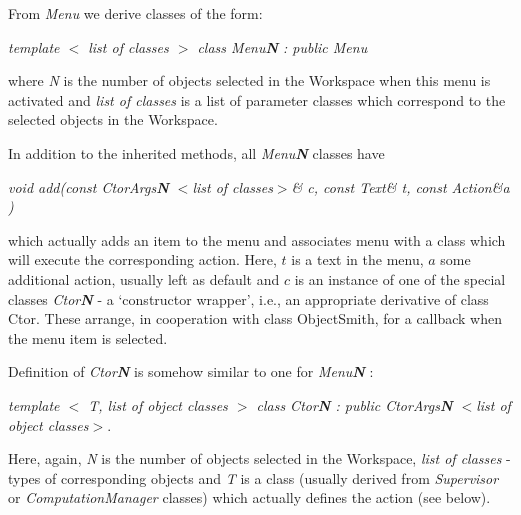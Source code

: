 \documentclass[12pt]{article}
\begin{document}
  From  \emph{Menu} we derive classes of the form:
  \begin{center}
  \emph{template $<$ list of classes $>$ class Menu\textbf{N} : public Menu}
  \end{center}
  where \emph{N} is the number of objects selected in the Workspace when this
  menu is activated and  \emph{list of classes} is a list of parameter classes 
  which correspond to the selected objects in the Workspace. 

  In addition to the inherited methods, all \emph{Menu\textbf{N}} classes
  have  
  \begin{center}
  \emph{void add(const CtorArgs\textbf{N} $<$list of classes$>$\& c, const Text\& 
  t, const Action\&a ) }
  \end{center}
  which actually adds an item to the menu and associates menu with a class
  which will execute the corresponding action. Here, $t$ is a text in the menu,
  $a$ some additional action, usually left as default and $c$ is an instance of
  one of the  special classes \emph{Ctor\textbf{N}} - a
   `constructor wrapper', i.e., an appropriate derivative of class Ctor.
   These arrange, in cooperation with class ObjectSmith, for a callback
   when the menu item is selected. 

  Definition of \emph{Ctor\textbf{N} } is somehow similar to one for 
  \emph{Menu\textbf{N} }:
  \begin{center}
  \emph{template $<$ T, list of object classes $>$ class Ctor\textbf{N} : public 
  CtorArgs\textbf{N}
   $<$list of object classes$>$}. 
  \end{center}
  Here, again, \emph{N} is the number of objects
   selected in the Workspace, \emph{list of classes} - types of corresponding 
  objects and \emph{T}  is a class (usually derived from \emph{Supervisor} or 
  \emph{ComputationManager} classes) which actually defines the action (see 
  below).
\end{document}
